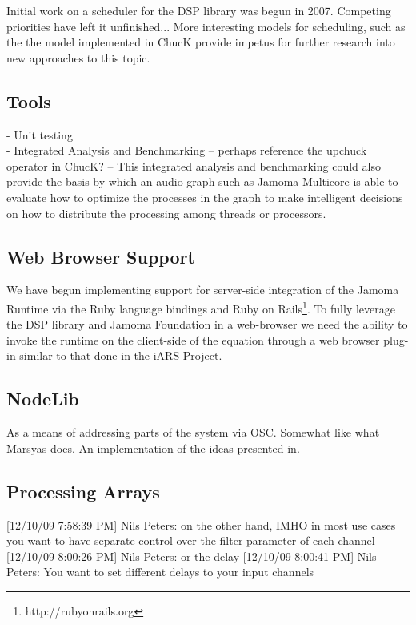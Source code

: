 \documentclass[twoside,10pt]{article}
\begin{document}
Initial work on a scheduler for the DSP library was begun in 2007.  Competing priorities have left it unfinished...  More interesting models for scheduling, such as the the model implemented in ChucK provide impetus for further research into new approaches to this topic.

\subsection{Tools}

- Unit testing      \\

- Integrated Analysis and Benchmarking -- perhaps reference the upchuck operator in ChucK?
   -- This integrated analysis and benchmarking could also provide the basis by which an audio graph such as Jamoma Multicore is able to evaluate how to optimize the processes in the graph to make intelligent decisions on how to distribute the processing among threads or processors.


\subsection{Web Browser Support}
We have begun implementing support for server-side integration of the Jamoma Runtime via the Ruby language bindings and Ruby on Rails\footnote{http://rubyonrails.org}.  To fully leverage the DSP library and Jamoma Foundation in a web-browser we need the ability to invoke the runtime on the client-side of the equation through a web browser plug-in similar to that done in the iARS Project\cite{Frauenberger:2003}.

\subsection{NodeLib}

As a means of addressing parts of the system via OSC.  Somewhat like what Marsyas does.  An implementation of the ideas presented in\cite{Place:2008osc}.

\subsection{Processing Arrays}
[12/10/09 7:58:39 PM] Nils Peters: on the other hand, IMHO in most use cases you want to have separate control over the filter parameter of each channel
[12/10/09 8:00:26 PM] Nils Peters: or the delay
[12/10/09 8:00:41 PM] Nils Peters: You want to set different delays to your input channels
\end{document}
